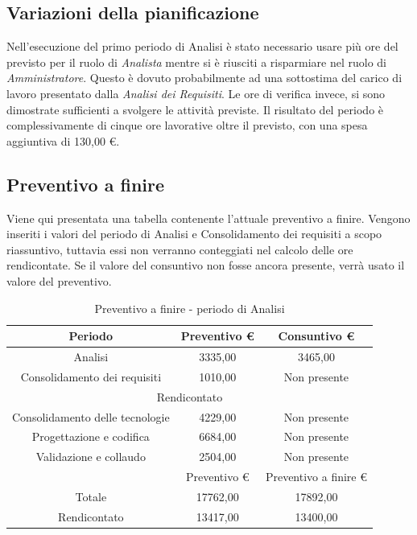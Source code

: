 \documentclass[./PianodiProgetto.tex]{subfiles}
\begin{document}
\subsection{Variazioni della pianificazione}
Nell'esecuzione del primo periodo di Analisi è stato necessario usare più
ore del previsto per il ruolo di \textit{Analista} mentre si è riusciti a risparmiare nel ruolo di \textit{Amministratore}. Questo è dovuto
probabilmente ad una sottostima del carico di lavoro presentato dalla \textit{Analisi
dei Requisiti}. Le ore di verifica invece, si sono dimostrate sufficienti a svolgere
le attività previste. Il risultato del periodo è complessivamente di cinque ore
lavorative oltre il previsto, con una spesa aggiuntiva di 130,00 \euro{}.

\subsection{Preventivo a finire}
Viene qui presentata una tabella contenente l'attuale preventivo a finire.
Vengono inseriti i valori del periodo di Analisi e Consolidamento dei requisiti a scopo riassuntivo, tuttavia essi non verranno conteggiati nel calcolo delle ore rendicontate. Se il valore del consuntivo non fosse ancora presente, verrà usato il valore del preventivo.

\begin{table}[H]
	\centering
	\begin{tabular}{|c|c|c|}
		\hline
		Periodo&Preventivo \euro{}&Consuntivo \euro{} \\ \hline
		Analisi&3335,00&3465,00  \\ \hline
		Consolidamento dei requisiti&1010,00&Non presente  \\ \hline
		\multicolumn{3}{|c|}{Rendicontato}  \\ \hline
		Consolidamento delle tecnologie&4229,00&Non presente  \\ \hline
		Progettazione e codifica&6684,00&Non presente  \\ \hline
		Validazione e collaudo&2504,00&Non presente  \\ \hline
		&Preventivo \euro{}&Preventivo a finire \euro{}  \\ \hline
		Totale&17762,00&17892,00 \\ \hline
		Rendicontato&13417,00&13400,00 \\ \hline
	\end{tabular}
	\caption{Preventivo a finire - periodo di Analisi}
\end{table}
\end{document}
